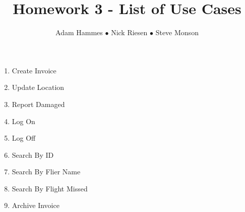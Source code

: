 \documentclass{article}
\title{Homework 3 - List of Use Cases}
\author{Adam Hammes $\bullet$ Nick Riesen $\bullet$ Steve Monson}
\begin{document}
\maketitle

\begin{enumerate}
    \item Create Invoice
    \item Update Location
    \item Report Damaged
    \item Log On
    \item Log Off
    \item Search By ID
    \item Search By Flier Name
    \item Search By Flight Missed
    \item Archive Invoice
\end{enumerate}
\end{document}
